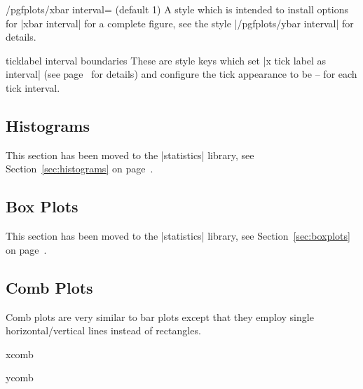{\begin{stylekey}{/pgfplots/xbar interval= (default 1)}
	A style which is intended to install options for |xbar interval| for a complete figure, see the style |/pgfplots/ybar interval| for details.
\end{stylekey}

\begin{pgfplotsxykey}{\x ticklabel interval boundaries}
	These are style keys which set |x tick label as interval| (see page~\pageref{key:pgfplots:ticklabelasinterval} for details) and configure the tick appearance to be  --  for each tick interval.
\end{pgfplotsxykey}

\subsection{Histograms}
This section has been moved to the |statistics| library, see Section~\ref{sec:histograms} on page~\pageref{sec:histograms}.

\subsection{Box Plots}
This section has been moved to the |statistics| library, see Section~\ref{sec:boxplots} on page~\pageref{sec:boxplots}.

\subsection{Comb Plots}
Comb plots are very similar to bar plots except that they employ single horizontal/vertical lines instead of rectangles.

\begin{plottype}{xcomb}
\begin{codeexample}[]
\end{codeexample}
\end{plottype}

\begin{plottype}{ycomb}
\begin{codeexample}[]
\end{codeexample}
\end{plottype}

}
